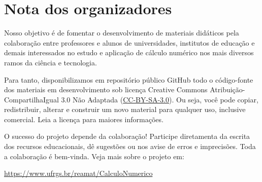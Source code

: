 
\chapter*{Nota dos organizadores}

Nosso objetivo é de fomentar o desenvolvimento de materiais didáticos pela colaboração entre professores e alunos de universidades, institutos de educação e demais interessados no estudo e aplicação de cálculo numérico nos mais diversos ramos da ciência e tecnologia.

Para tanto, disponibilizamos em repositório público GitHub todo o código-fonte dos materiais em desenvolvimento sob licença Creative Commons Atribuição-CompartilhaIgual 3.0 Não Adaptada (\href{https://creativecommons.org/licenses/by-sa/3.0/}{CC-BY-SA-3.0}). Ou seja, você pode copiar, redistribuir, alterar e construir um novo material para qualquer uso, inclusive comercial. Leia a licença para maiores informações.

O sucesso do projeto depende da colaboração! Participe diretamenta da escrita dos recursos educacionais, dê sugestões ou nos avise de erros e imprecisões. Toda a colaboração é bem-vinda. Veja mais sobre o projeto em:
\begin{center}
  \url{https://www.ufrgs.br/reamat/CalculoNumerico}
\end{center}



